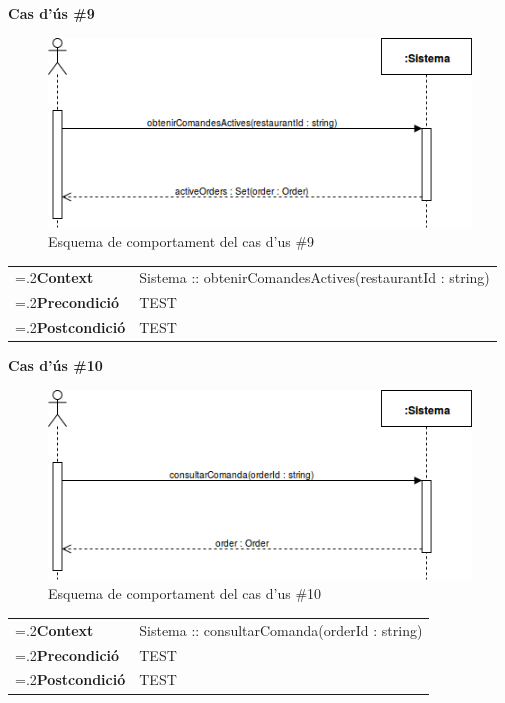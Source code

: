 \clearpage
\noindent\textbf{\large Cas d'ús \#9}\\
\begin{figure}[H]
\centering
\includegraphics[scale=0.6]{Figures/casdus_09.png}
\caption{Esquema de comportament del cas d'us \#9}
\end{figure}
\begin{table}[h]
\noindent
\begin{tabularx}{\linewidth}{
>{\hsize=.2\hsize}X%
>{\hsize=0.8\hsize}X%
}
\textbf{Context} 		& Sistema :: obtenirComandesActives(restaurantId : string) \\
\textbf{Precondició} 	& TEST \\
\textbf{Postcondició}	& TEST \\
\end{tabularx}
\label{}
\end{table}

\noindent\textbf{\large Cas d'ús \#10}\\
\begin{figure}[H]
\centering
\includegraphics[scale=0.6]{Figures/casdus_10.png}
\caption{Esquema de comportament del cas d'us \#10}
\end{figure}
\begin{table}[h]
\noindent
\begin{tabularx}{\linewidth}{
>{\hsize=.2\hsize}X%
>{\hsize=0.8\hsize}X%
}
\textbf{Context} 		& Sistema :: consultarComanda(orderId : string) \\
\textbf{Precondició} 	& TEST \\
\textbf{Postcondició}	& TEST \\
\end{tabularx}
\label{}
\end{table}

